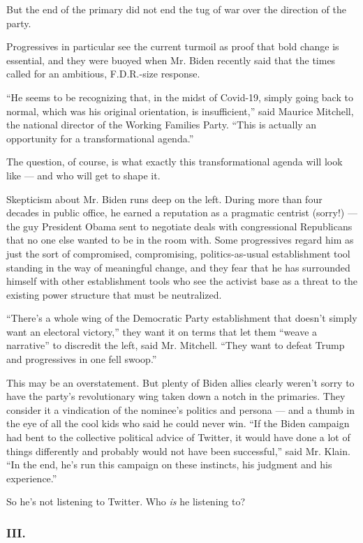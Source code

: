 But the end of the primary did not end the tug of war over the direction
of the party.

Progressives in particular see the current turmoil as proof that bold
change is essential, and they were buoyed when Mr. Biden recently said
that the times called for an ambitious, F.D.R.-size response.

``He seems to be recognizing that, in the midst of Covid-19, simply
going back to normal, which was his original orientation, is
insufficient,'' said Maurice Mitchell, the national director of the
Working Families Party. ``This is actually an opportunity for a
transformational agenda.''

The question, of course, is what exactly this transformational agenda
will look like --- and who will get to shape it.

Skepticism about Mr. Biden runs deep on the left. During more than four
decades in public office, he earned a reputation as a pragmatic centrist
(sorry!) --- the guy President Obama sent to negotiate deals with
congressional Republicans that no one else wanted to be in the room
with. Some progressives regard him as just the sort of compromised,
compromising, politics-as-usual establishment tool standing in the way
of meaningful change, and they fear that he has surrounded himself with
other establishment tools who see the activist base as a threat to the
existing power structure that must be neutralized.

``There's a whole wing of the Democratic Party establishment that
doesn't simply want an electoral victory,'' they want it on terms that
let them ``weave a narrative'' to discredit the left, said Mr. Mitchell.
``They want to defeat Trump and progressives in one fell swoop.''

This may be an overstatement. But plenty of Biden allies clearly weren't
sorry to have the party's revolutionary wing taken down a notch in the
primaries. They consider it a vindication of the nominee's politics and
persona --- and a thumb in the eye of all the cool kids who said he
could never win. ``If the Biden campaign had bent to the collective
political advice of Twitter, it would have done a lot of things
differently and probably would not have been successful,'' said Mr.
Klain. ``In the end, he's run this campaign on these instincts, his
judgment and his experience.''

So he's not listening to Twitter. Who \emph{is} he listening to?

\hypertarget{iii}{%
\subsubsection{III.}\label{iii}}

